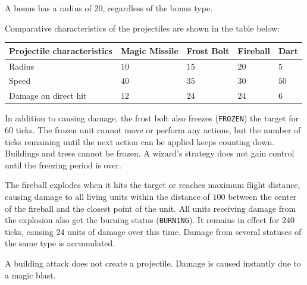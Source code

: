 A bonus has a radius of $20$, regardless of the bonus type.
 
Comparative characteristics of the projectiles are shown in the table below:
 
\begin{tabular}{| l | l | l | l | l |}
 \hline
 Projectile characteristics     & Magic Missile & Frost Bolt & Fireball         & Dart \\
 \hline
 Radius         & $10$          & $15$          & $20$                      & $5$  \\
 Speed                      & $40$          & $35$          & $30$                      & $50$   \\
 Damage on direct hit & $12$            & $24$          & $24$\footnotemark[11] & $6$       \\
 \hline
\end{tabular}
 
 
In addition to causing damage, the frost bolt also freezes (\texttt{FROZEN}) the target for $60$ ticks. The frozen unit cannot
move or perform any actions, but the number of ticks remaining until the next action can be applied keeps counting down.
Buildings and trees cannot be frozen. A wizard’s strategy does not gain control until the freezing period is over.
 
The fireball explodes when it hits the target or reaches maximum flight distance, causing damage to all living units within
the distance of $100$ between the center of the fireball and the closest point of the unit. All units receiving damage from the explosion also
get the burning status (\texttt{BURNING}). It remains in effect for $240$ ticks, causing $24$ units of damage over this time. Damage from several
statuses of the same type is accumulated.
 
A building attack does not create a projectile. Damage is caused instantly due to a magic blast.

